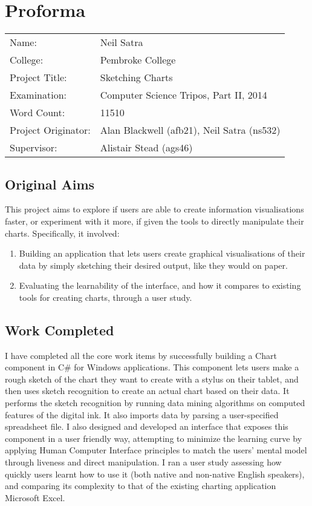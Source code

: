 \setcounter{page}{1}
\chapter*{Proforma}

\begin{tabular}{ll}
Name:               & Neil Satra					\\
College:            & Pembroke College				\\
Project Title:      & Sketching Charts				\\
Examination:        & Computer Science Tripos, Part II, 2014        \\
Word Count:         & 11510							\\
Project Originator: & Alan Blackwell (afb21), Neil Satra (ns532)        \\
Supervisor:         & Alistair Stead (ags46)				\\ 
\end{tabular}

\section*{Original Aims}
This project aims to explore if users are able to create information visualisations faster, or experiment with it more, if given the tools to directly manipulate their charts. Specifically, it involved:
\begin{enumerate}

	\item Building an application that lets users create graphical visualisations of their data by simply sketching their desired output, like they would on paper.

	\item Evaluating the learnability of the interface, and how it compares to existing tools for creating charts, through a user study.

\end{enumerate}

\section*{Work Completed}
I have completed all the core work items by successfully building a Chart component in C\# for Windows applications. This component lets users make a rough sketch of the chart they want to create with a stylus on their tablet, and then uses sketch recognition to create an actual chart based on their data. It performs the sketch recognition by running data mining algorithms on computed features of the digital ink. It also imports data by parsing a user-specified spreadsheet file. I also designed and developed an interface that exposes this component in a user friendly way, attempting to minimize the learning curve by applying Human Computer Interface principles to match the users' mental model through liveness and direct manipulation. I ran a user study assessing how quickly users learnt how to use it (both native and non-native English speakers), and comparing its complexity to that of the existing charting application Microsoft Excel.


